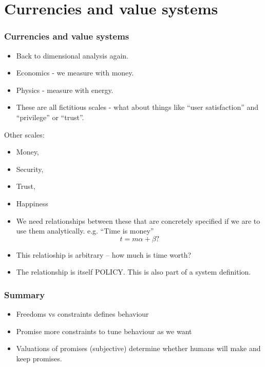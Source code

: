 \documentclass[12pt]{beamer}
\begin{document}
\section{Currencies and value systems}

\frame
{
\frametitle{Currencies and value systems}
\begin{itemize}
\item Back to dimensional analysis again.

\item Economics - we measure with money.

\item Physics - measure with energy.

\item These are all fictitious scales - what about things like ``user
satisfaction'' and ``privilege'' or ``trust''.
\end{itemize}
}


\frame
{
Other scales:
\begin{itemize}
\item Money, 
\item Security, 
\item Trust, 
\item Happiness
\end{itemize}
}


\frame
{
\begin{itemize}

\item We need relationships between these that are concretely specified if we are
to use them analytically. e.g. ``Time is money''
$$
t = m\alpha +\beta ?
$$
\item This relatioship is arbitrary -- how much is time worth? 

\item The relationship is itself POLICY.
This is also part of a system definition.
\end{itemize}
}

\frame
{
\frametitle{Summary}
\begin{itemize}
\item Freedoms vs constraints defines behaviour
\item Promise more constraints to tune behaviour as we want
\item Valuations of promises (subjective) determine whether humans
will make and keep promises.
\end{itemize}
}
\end{document}
